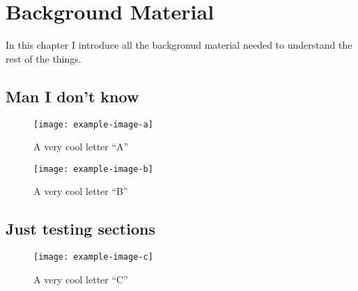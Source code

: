 \chapter{Background Material}


In this chapter I introduce all the backgronud material needed to understand the
rest of the things.

\section{Man I don't know}
\begin{figure}
  \centering
  \label{fig:one}
  \caption{A very cool letter ``A''}
\texttt{[image: example-image-a]}
\end{figure}
\lipsum[1-5]
\begin{figure}
  \centering
  \label{fig:two}
  \caption{A very cool letter ``B''}
\texttt{[image: example-image-b]}
\end{figure}
\lipsum[5-10]


\section{Just testing sections}
\begin{figure}
  \centering
  \label{fig:three}
  \caption{A very cool letter ``C''}
\texttt{[image: example-image-c]}
\end{figure}
\lipsum[11-20]
